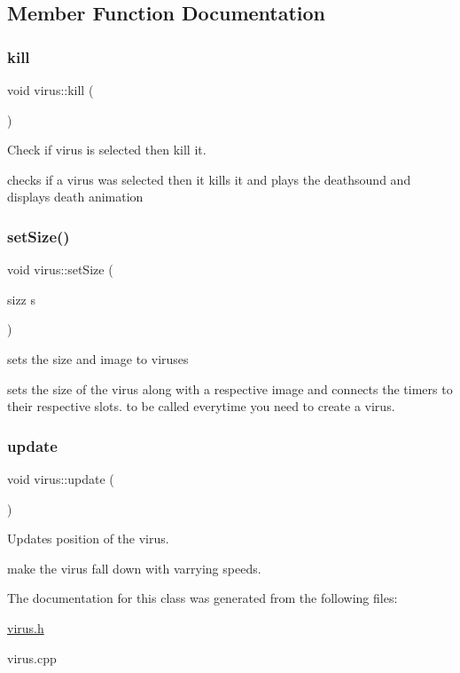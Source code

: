 \subsection{Member Function Documentation}
\mbox{\label{classvirus_a456b60cbaeed1b370a7f668111e34401}} 
\subsubsection{\texorpdfstring{kill}{kill}}
{\footnotesize\ttfamily void virus\+::kill (\begin{DoxyParamCaption}{ }\end{DoxyParamCaption})\hspace{0.3cm}{\ttfamily [slot]}}



Check if virus is selected then kill it. 

checks if a virus was selected then it kills it and plays the deathsound and displays death animation \mbox{\label{classvirus_a7e52ed4f11deb1997a7fdbc07c7b038a}} 
\subsubsection{\texorpdfstring{set\+Size()}{setSize()}}
{\footnotesize\ttfamily void virus\+::set\+Size (\begin{DoxyParamCaption}\item[{sizz}]{s }\end{DoxyParamCaption})}



sets the size and image to viruses 

sets the size of the virus along with a respective image and connects the timers to their respective slots. to be called everytime you need to create a virus. \mbox{\label{classvirus_a8b036fc788433ad3a705e9de6de41ee2}} 
\subsubsection{\texorpdfstring{update}{update}}
{\footnotesize\ttfamily void virus\+::update (\begin{DoxyParamCaption}{ }\end{DoxyParamCaption})\hspace{0.3cm}{\ttfamily [slot]}}



Updates position of the virus. 

make the virus fall down with varrying speeds. 

The documentation for this class was generated from the following files\+:\begin{DoxyCompactItemize}
\item 
\hyperlink{virus_8h}{virus.\+h}\item 
virus.\+cpp\end{DoxyCompactItemize}
